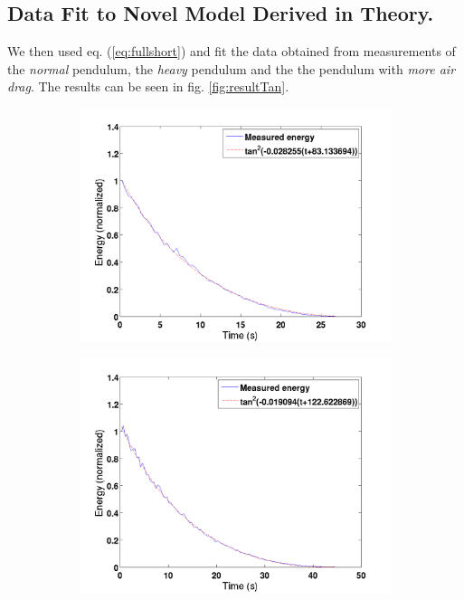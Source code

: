 \subsection{Data Fit to Novel Model Derived in Theory.}\label{sec:novel}
We then used eq. (\ref{eq:fullshort}) and fit the data obtained from measurements of the \emph{normal} pendulum, the \emph{heavy} pendulum and the the pendulum with \emph{more air drag}. The results can be seen in fig. \ref{fig:resultTan}.
\begin{figure}[htbp]
\centering
\begin{subfigure}{.45\textwidth}
	\centering
	\includegraphics[width=\textwidth]{img/resultTanNormal}
	\caption{}
	\label{fig:resultTanNormal}
\end{subfigure}
\begin{subfigure}{.45\textwidth}
	\centering
	\includegraphics[width=\textwidth]{img/resultTanHeavy}

\end{subfigure}
\end{figure}
